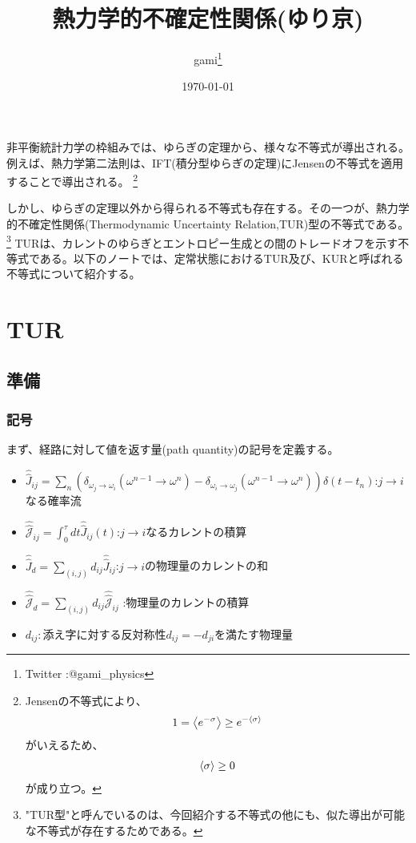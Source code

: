 \documentclass[a4paper,11pt]{jsarticle}
\numberwithin{equation}{section}
\begin{document}
\title{熱力学的不確定性関係(ゆり京)}
\author{gami\footnote{Twitter :@gami\_physics}}
\date{\today}
\maketitle

非平衡統計力学の枠組みでは、ゆらぎの定理から、様々な不等式が導出される。例えば、熱力学第二法則は、IFT(積分型ゆらぎの定理)にJensenの不等式を適用することで導出される。
\footnote{
    Jensenの不等式により、
    \begin{align}
       1 = \ev{e^{-\sigma}} \geq e^{-\ev{\sigma}}
    \end{align}
    がいえるため、
    \begin{align}
        \ev{\sigma} \geq 0
    \end{align}
    が成り立つ。
}


しかし、ゆらぎの定理以外から得られる不等式も存在する。その一つが、熱力学的不確定性関係(Thermodynamic Uncertainty Relation,TUR)型の不等式である。
\footnote{"TUR型"と呼んでいるのは、今回紹介する不等式の他にも、似た導出が可能な不等式が存在するためである。}
TURは、カレントのゆらぎとエントロピー生成との間のトレードオフを示す不等式である。以下のノートでは、定常状態におけるTUR及び、KURと呼ばれる不等式について紹介する。



\section{TUR}
\subsection{準備}
\subsubsection{記号}
まず、経路に対して値を返す量(path quantity)の記号を定義する。
\begin{itemize}
    \item  $ \hat{\hat{J}}_{ij} =\sum_{n} (\delta_{\omega_j \to \omega_i}(\omega^{n-1}\to \omega^n) - \delta_{\omega_i \to \omega_j}(\omega^{n-1}\to \omega^n)) \delta(t-t_n)$:$j \to i$なる確率流
    \item $\hat{\hat{\mathcal{J}}}_{ij} = 
    \int_{0}^{\tau} dt \hat{\hat{J}}_{ij}(t)$:$j \to i$なるカレントの積算
    \item $\hat{\hat{J}}_{d} = \sum_{(i,j)} d_{ij} \hat{\hat{J}}_{ij}$:$j \to i$の物理量のカレントの和
    \item $\hat{\hat{\mathcal{J}}}_{d} = \sum_{(i,j)} d_{ij} \hat{\hat{\mathcal{J}}}_{ij}$
:物理量のカレントの積算
    \item $d_{ij}:$添え字に対する反対称性$d_{ij} = -d_{ji}$を満たす物理量
\end{itemize}
\end{document}
